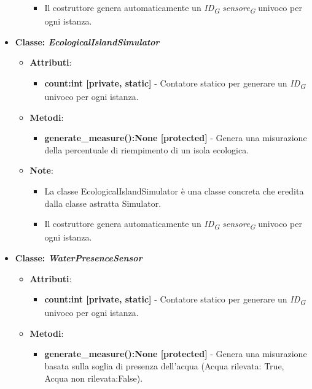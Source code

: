 \begin{itemize}
\begin{itemize}
\begin{itemize}
        \item Il costruttore genera automaticamente un \textit{ID}\textsubscript{\textit{G}} \textit{sensore}\textsubscript{\textit{G}} univoco per ogni istanza.
    \end{itemize}
\end{itemize}
    \item{\textbf{Classe: \textit{EcologicalIslandSimulator}}}
    \begin{itemize}
        \item    \textbf{Attributi}: 
    \begin{itemize}
        \item \textbf{count:int [private, static]} - Contatore statico per generare un \textit{ID}\textsubscript{\textit{G}} univoco per ogni istanza.
    \end{itemize}
    \item    \textbf{Metodi}: 
    \begin{itemize}
        \item \textbf{generate\_measure():None [protected]} - Genera una misurazione della percentuale di riempimento di un isola ecologica.
    \end{itemize}
    \item    \textbf{Note}:
    \begin{itemize}
        \item La classe EcologicalIslandSimulator è una classe concreta che eredita dalla classe astratta Simulator.
        \item Il costruttore genera automaticamente un \textit{ID}\textsubscript{\textit{G}} \textit{sensore}\textsubscript{\textit{G}} univoco per ogni istanza.
    \end{itemize}
\end{itemize}
    \item{\textbf{Classe: \textit{WaterPresenceSensor}}}
    \begin{itemize}
        \item    \textbf{Attributi}: 
    \begin{itemize}
        \item \textbf{count:int [private, static]} - Contatore statico per generare un \textit{ID}\textsubscript{\textit{G}} univoco per ogni istanza.
    \end{itemize}
    \item    \textbf{Metodi}: 
    \begin{itemize}
        \item \textbf{generate\_measure():None [protected]} - Genera una misurazione basata sulla soglia di presenza dell'acqua (Acqua rilevata: True, Acqua non rilevata:False).

\end{itemize}
\end{itemize}
\end{itemize}
